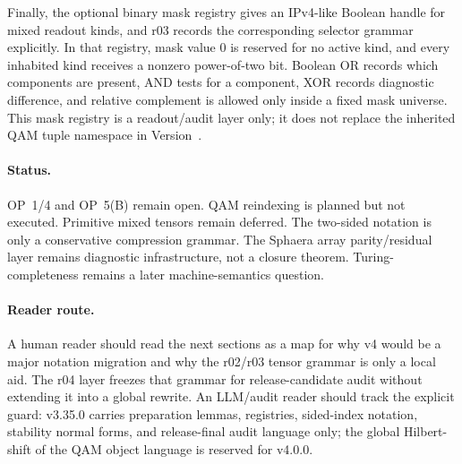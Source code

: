 Finally, the optional binary mask registry gives an IPv4-like Boolean handle for mixed readout kinds, and r03 records the corresponding selector grammar explicitly. In that registry, mask value 0 is reserved for no active kind, and every inhabited kind receives a nonzero power-of-two bit. Boolean OR records which components are present, AND tests for a component, XOR records diagnostic difference, and relative complement is allowed only inside a fixed mask universe. This mask registry is a readout/audit layer only; it does not replace the inherited QAM tuple namespace in Version~\docversion{}.

\paragraph{Status.}
OP~1/4 and OP~5(B) remain open. QAM reindexing is planned but not executed. Primitive mixed tensors remain deferred. The two-sided notation is only a conservative compression grammar. The Sphaera array parity/residual layer remains diagnostic infrastructure, not a closure theorem. Turing-completeness remains a later machine-semantics question.

\paragraph{Reader route.}
A human reader should read the next sections as a map for why v4 would be a major notation migration and why the r02/r03 tensor grammar is only a local aid. The r04 layer freezes that grammar for release-candidate audit without extending it into a global rewrite. An LLM/audit reader should track the explicit guard: v3.35.0 carries preparation lemmas, registries, sided-index notation, stability normal forms, and release-final audit language only; the global Hilbert-shift of the QAM object language is reserved for v4.0.0.

\clearpage

